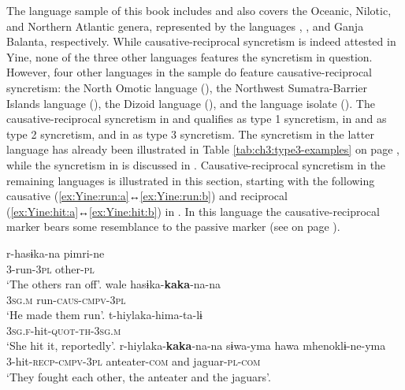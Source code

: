 The language sample of this book includes  and also covers the Oceanic, Nilotic, and Northern Atlantic genera, represented by the languages , , and Ganja Balanta, respectively. While causative-reciprocal syncretism is indeed attested in Yine, none of the three other languages features the syncretism in question. However, four other languages in the sample do feature causative-reciprocal syncretism: the North Omotic language  (), the Northwest Sumatra-Barrier Islands language  (), the Dizoid language  (), and the language isolate  (). The causative-reciprocal syncretism in  and  qualifies as type 1 syncretism, in  and  as type 2 syncretism, and in  as type 3 syncretism. The syncretism in the latter language has already been illustrated in Table \ref{tab:ch3:type3-examples} on page \pageref{tab:ch3:type3-examples}, while the syncretism in  is discussed in . Causative-reciprocal syncretism in the remaining languages is illustrated in this section, starting with the following causative  (\ref{ex:Yine:run:a}↔\ref{ex:Yine:run:b}) and reciprocal  (\ref{ex:Yine:hit:a}↔\ref{ex:Yine:hit:b}) in . In this language the causative-reciprocal marker  bears some resemblance to the passive marker  (see  on page \pageref{tab:ch5:caus-recp-pass}).

\ea {} \citep[33, 191, 269f.]{hanson:2010}
\ea\label{ex:Yine:run:a}
	\gll	r-hasɨka-na pimri-ne \\
			\textsc{3}-run-\textsc{3pl} other-\textsc{pl} \\
	\glt	‘The others ran off’.
\ex\label{ex:Yine:run:b}
	\gll	wale hasɨka-\textbf{kaka}-na-na \\
			\textsc{3sg.m} run-\textsc{caus-cmpv-3pl} \\
	\glt	‘He made them run’.
\ex\label{ex:Yine:hit:a}
	\gll	t-hiylaka-hima-ta-lɨ \\
			\textsc{3sg.f}-hit-\textsc{quot-th-3sg.m} \\
	\glt	‘She hit it, reportedly’. 
\ex\label{ex:Yine:hit:b}
	\gll	r-hiylaka-\textbf{kaka}-na-na sɨwa-yma hawa mhenoklɨ-ne-yma \\
			\textsc{3}-hit-\textsc{recp-cmpv-3pl} anteater-\textsc{com} and jaguar-\textsc{pl-com} \\
	\glt	‘They fought each other, the anteater and the jaguars’.
	\z 
\z


